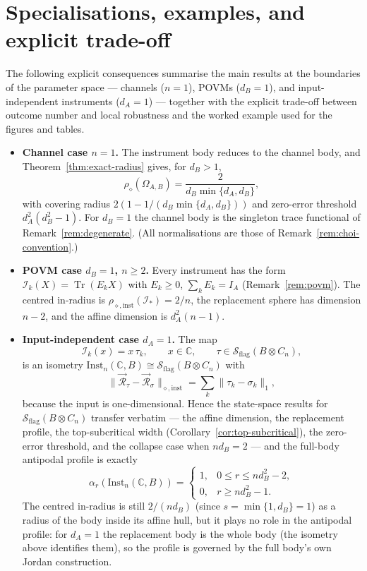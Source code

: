 \documentclass[11pt,a4paper]{article}
\newcommand{\Sstate}{\mathcal{S}}
\newcommand{\Inst}{\mathrm{Inst}}
\newcommand{\Tr}{\operatorname{Tr}}
\begin{document}
\section{Specialisations, examples, and explicit trade-off}
\label{sec:specialisations}

The following explicit consequences summarise the main results at the boundaries of the parameter space --- channels ($n=1$), POVMs ($d_B=1$), and input-independent instruments ($d_A=1$) --- together with the explicit trade-off between outcome number and local robustness and the worked example used for the figures and tables.

\begin{itemize}[leftmargin=*,itemsep=3pt]
\item \textbf{Channel case $n=1$.} The instrument body reduces to the channel body, and Theorem~\ref{thm:exact-radius} gives, for $d_B>1$,
\[
\rho_\diamond(\Omega_{A,B})=\frac{2}{d_B\min\{d_A,d_B\}},
\]
with covering radius $2(1-1/(d_B\min\{d_A,d_B\}))$ and zero-error threshold $d_A^2(d_B^2-1)$. For $d_B=1$ the channel body is the singleton trace functional of Remark~\ref{rem:degenerate}. (All normalisations are those of Remark~\ref{rem:choi-convention}.)

\item \textbf{POVM case $d_B=1$, $n\ge2$.} Every instrument has the form $\mathcal I_k(X)=\Tr(E_kX)$ with $E_k\ge0$, $\sum_kE_k=I_A$ (Remark~\ref{rem:povm}). The centred in-radius is $\rho_{\diamond,\mathrm{inst}}(\mathcal I_*)=2/n$, the replacement sphere has dimension $n-2$, and the affine dimension is $d_A^2(n-1)$.

\item \textbf{Input-independent case $d_A=1$.} The map
\[
\mathcal I_k(x)=x\,\tau_k,\qquad x\in\mathbb C,\qquad \tau\in\Sstate_{\mathrm{flag}}(B\otimes C_n),
\]
is an isometry $\Inst_n(\mathbb C,B)\cong\Sstate_{\mathrm{flag}}(B\otimes C_n)$ with
\[
\|\vec{\mathcal R}_\tau-\vec{\mathcal R}_\sigma\|_{\diamond,\mathrm{inst}}
=\sum_k\|\tau_k-\sigma_k\|_1,
\]
because the input is one-dimensional. Hence the state-space results for $\Sstate_{\mathrm{flag}}(B\otimes C_n)$ transfer verbatim --- the affine dimension, the replacement profile, the top-subcritical width (Corollary~\ref{cor:top-subcritical}), the zero-error threshold, and the collapse case when $nd_B=2$ --- and the full-body antipodal profile is exactly
\[
\alpha_r(\Inst_n(\mathbb C,B))=
\begin{cases}
1,&0\le r\le nd_B^2-2,\\
0,&r\ge nd_B^2-1.
\end{cases}
\]
The centred in-radius is still $2/(nd_B)$ (since $s=\min\{1,d_B\}=1$) as a radius of the body inside its affine hull, but it plays no role in the antipodal profile: for $d_A=1$ the replacement body is the whole body (the isometry above identifies them), so the profile is governed by the full body's own Jordan construction.



\end{itemize}
\end{document}
